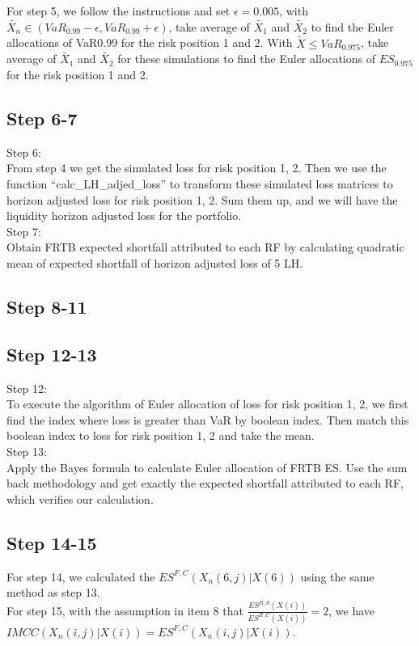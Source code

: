 \documentclass{article}
\begin{document}
\noindent For step 5, we follow the instructions and set $\epsilon = 0.005$, with $\tilde {X_n} \in (VaR_{0.99} - \epsilon, VaR_{0.99} + \epsilon)$, take average of $\tilde {X_1}$ and $\tilde {X_2}$ to find the Euler allocations of
VaR0.99 for the risk position 1 and 2.
With $\tilde {X} \leq VaR_{0.975}$,  take average of $\tilde {X_1}$ and $\tilde {X_2}$ for these simulations to find the Euler allocations of $ES_{0.975}$ for the risk position 1 and 2.
\subsection*{Step 6-7}
Step 6:\\
From step 4 we get the simulated loss for risk position 1, 2. Then we use the function “calc\_LH\_adjed\_loss” to transform these simulated loss matrices to horizon adjusted loss for risk position 1, 2. Sum them up, and we will have the liquidity horizon adjusted loss for the portfolio.
\\Step 7:\\
Obtain FRTB expected shortfall attributed to each RF by calculating quadratic mean of expected shortfall of horizon adjusted loss of 5 LH.

\subsection*{Step 8-11}
\subsection*{Step 12-13}
Step 12:\\
To execute the algorithm of Euler allocation of loss for risk position 1, 2, we first find the index where loss is greater than VaR by boolean index. Then match this boolean index to loss for risk position 1, 2 and take the mean.
\\Step 13:\\
Apply the Bayes formula to calculate Euler allocation of FRTB ES.
Use the sum back methodology and get exactly the expected shortfall attributed to each RF, which verifies our calculation.

\subsection*{Step 14-15}
For step 14, we calculated the $ES^{F,C}(X_n(6,j)|X(6))$ using the same method as step 13.
\\For step 15, with the assumption in item 8 that $\frac {ES^{R,S}(X(i))} {ES^{R,C}(X(i))} = 2$, we have $IMCC(X_n(i,j)|X(i))=ES^{F,C}(X_n(i,j)|X(i))$.
\end{document}
